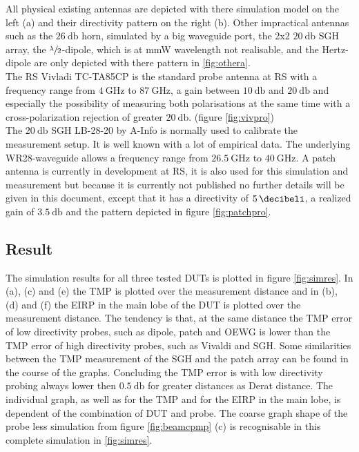 All physical existing antennas are depicted with there simulation model on the left (a) and their directivity pattern on the right (b). Other impractical antennas such as the $\SI{26}{\decibel}$ horn, simulated by a big waveguide port, the 2x2 $\SI{20}{\decibel}$ \ac{SGH} array, the $\sfrac{\lambda}{2}$-dipole, which is at \ac{mmW} wavelength not realisable, and the Hertz-dipole are only depicted with there pattern in \ref{fig:othera}.\\
The \ac{RS} Vivladi TC-TA85CP is the standard probe antenna at \ac{RS} with a frequency range from $\SI{4}{\giga\hertz}$ to $\SI{87}{\giga\hertz}$, a gain between $\SI{10}{\decibel}$ and $\SI{20}{\decibel}$ and especially the possibility of measuring both polarisations at the same time with a cross-polarization rejection of greater $\SI{20}{\decibel}$. (figure \ref{fig:vivpro})\\
The $\SI{20}{\decibel}$ \ac{SGH} LB-28-20 by A-Info is normally used to calibrate the measurement setup. It is well known with a lot of empirical data. The underlying WR28-waveguide allows a frequency range from $\SI{26.5}{\giga\hertz}$ to $\SI{40}{\giga\hertz}$. A patch antenna is currently in development at \ac{RS}, it is also used for this simulation and measurement but because it is currently not published no further details will be given in this document, except that it has a directivity of $\SI{5}{\decibeli}$, a realized gain of $\SI{3.5}{\decibel}$ and the pattern depicted in figure \ref{fig:patchpro}. 

\subsection{Result}

The simulation results for all three tested \acp{DUT} is plotted in figure \ref{fig:simres}. In (a), (c) and (e) the \ac{TMP} is plotted over the measurement distance and in (b), (d) and (f) the \ac{EIRP} in the main lobe of the \ac{DUT} is plotted over the measurement distance. The tendency is that, at the same distance the \ac{TMP} error of low directivity probes, such as dipole, patch and \ac{OEWG} is lower than the \ac{TMP} error of high directivity probes, such as Vivaldi and \ac{SGH}. Some similarities between the \ac{TMP} measurement of the \ac{SGH} and the patch array can be found in the course of the graphs. Concluding the \ac{TMP} error is with low directivity probing always lower then $\SI{0.5}{\decibel}$ for greater distances as Derat distance. The individual graph, as well as for the \ac{TMP} and for the \ac{EIRP} in the main lobe, is dependent of the combination of \ac{DUT} and probe. The coarse graph shape of the probe less simulation from figure \ref{fig:beamcpmp} (c) is recognisable in this complete simulation in \ref{fig:simres}. 

